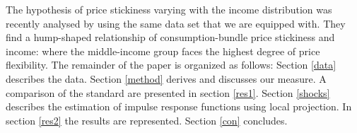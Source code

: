 \documentclass{article}
\begin{document}
The hypothesis of price stickiness varying with the income distribution was recently analysed by \cite{Cravino2018PricePolicy} using the same data set that we are equipped with. They find a hump-shaped relationship of consumption-bundle price stickiness and income: where the middle-income group faces the highest degree of price flexibility.
The remainder of the paper is organized as follows: Section \ref{data} describes the data. Section \ref{method} derives and discusses our measure. A comparison of the standard are presented in section \ref{res1}. Section \ref{shocks} describes the estimation of impulse response functions using local projection. In section \ref{res2} the results are represented. Section \ref{con} concludes.

\end{document}
